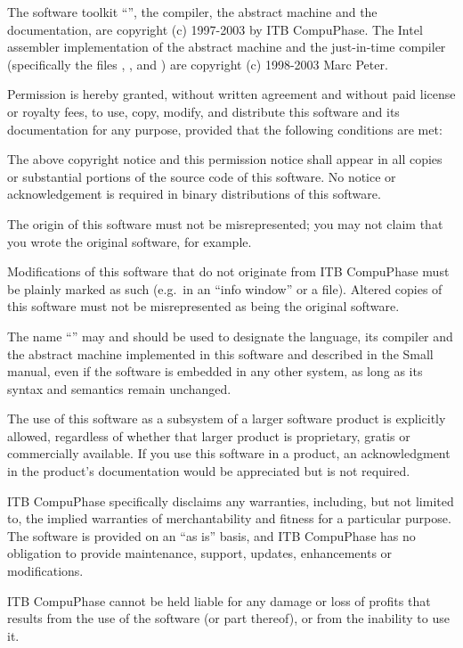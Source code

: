 The software toolkit ``\Small'', the compiler, the abstract machine and the
documentation, are copyright (c) 1997-2003 by ITB CompuPhase. The Intel
assembler implementation of the abstract machine and the just-in-time
compiler (specifically the files , ,  and
) are copyright (c) 1998-2003 Marc Peter.

Permission is hereby granted, without written agreement and without paid
license or royalty fees, to use, copy, modify, and distribute this software
and its documentation for any purpose, provided that the following conditions
are met:

\beginlist{15pt}
\list{\lnumber}
   The above copyright notice and this permission notice shall appear in all
   copies or substantial portions of the source code of this software. No
   notice or acknowledgement is required in binary distributions of this
   software.

\list{\lnumber}
   The origin of this software must not be misrepresented; you may not claim
   that you wrote the original software, for example.

\list{\lnumber}
   Modifications of this software that do not originate from ITB CompuPhase
   must be plainly marked as such (e.g.\ in an ``info window'' or a
    file). Altered copies of this software must not be
   misrepresented as being the original software.

\list{\lnumber}
   The name ``\Small'' may and should be used to designate the language, its
   compiler and the abstract machine implemented in this software and
   described in the Small manual, even if the software is embedded in any
   other system, as long as its syntax and semantics remain unchanged.
\endlist

The use of this software as a subsystem of a larger software product is
explicitly allowed, regardless of whether that larger product is proprietary,
gratis or commercially available. If you use this software in a product, an
acknowledgment in the product's documentation would be appreciated but is not
required.

ITB CompuPhase specifically disclaims any warranties, including, but not
limited to, the implied warranties of merchantability and fitness for a
particular purpose. The software is provided on an ``as is'' basis, and
ITB CompuPhase has no obligation to provide maintenance, support, updates,
enhancements or modifications.

ITB CompuPhase cannot be held liable for any damage or loss of profits that
results from the use of the software (or part thereof), or from the inability
to use it.
